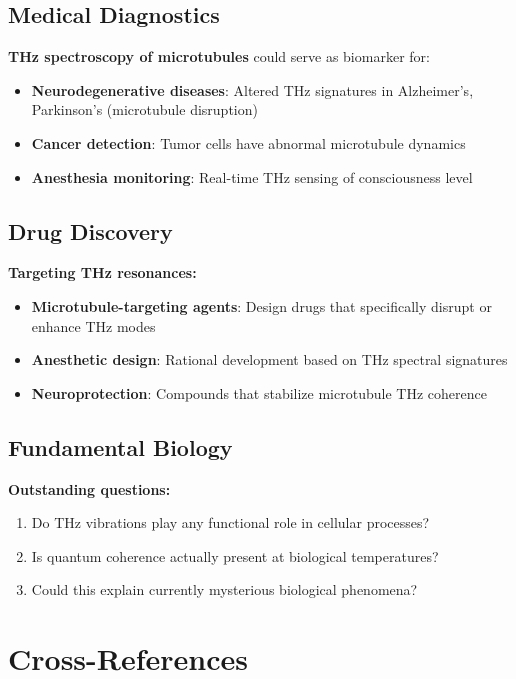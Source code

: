 \subsection{Medical Diagnostics}

\textbf{THz spectroscopy of microtubules} could serve as biomarker for:
\begin{itemize}
\item \textbf{Neurodegenerative diseases}: Altered THz signatures in Alzheimer's, Parkinson's (microtubule disruption)
\item \textbf{Cancer detection}: Tumor cells have abnormal microtubule dynamics
\item \textbf{Anesthesia monitoring}: Real-time THz sensing of consciousness level
\end{itemize}

\subsection{Drug Discovery}

\textbf{Targeting THz resonances:}
\begin{itemize}
\item \textbf{Microtubule-targeting agents}: Design drugs that specifically disrupt or enhance THz modes
\item \textbf{Anesthetic design}: Rational development based on THz spectral signatures
\item \textbf{Neuroprotection}: Compounds that stabilize microtubule THz coherence
\end{itemize}

\subsection{Fundamental Biology}

\textbf{Outstanding questions:}
\begin{enumerate}
\item Do THz vibrations play any functional role in cellular processes?
\item Is quantum coherence actually present at biological temperatures?
\item Could this explain currently mysterious biological phenomena?
\end{enumerate}

\section{Cross-References}

